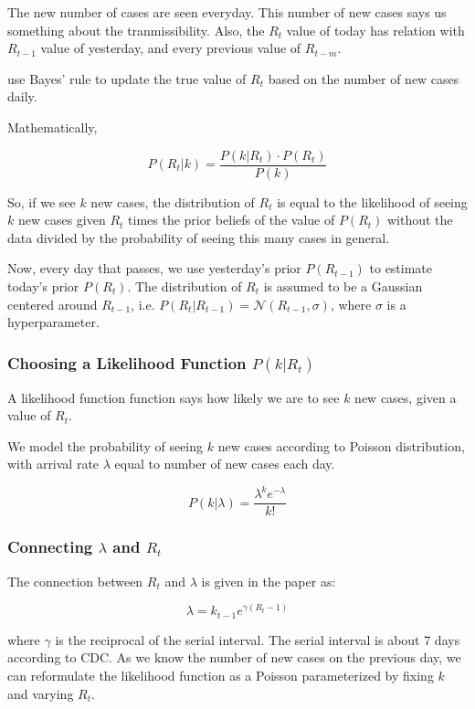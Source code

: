 \documentclass{article}
\begin{document}
The new number of cases are seen everyday. This number of new cases says us something about the tranmissibility. Also, the $R_t$ value of today has relation with $R_{t-1}$ value of yesterday, and every previous value of $R_{t-m}$.

\cite{bettencourt2008real} use Bayes' rule to update the true value of $R_t$ based on the number of new cases daily.

Mathematically,

$$ P(R_t|k)=\frac{P(k|R_t)\cdot P(R_t)}{P(k)} $$

So, if we see $k$ new cases, the distribution of $R_t$ is equal to the likelihood of seeing $k$ new cases given $R_t$ times the prior beliefs of the value of $P(R_t)$ without the data divided by the probability of seeing this many cases in general.

Now, every day that passes, we use yesterday's prior $P(R_{t-1})$ to estimate today's prior $P(R_t)$. The distribution of $R_t$ is assumed to be a Gaussian centered around $R_{t-1}$, i.e. $P(R_t|R_{t-1})=\mathcal{N}(R_{t-1}, \sigma)$, where $\sigma$ is a hyperparameter.

\subsubsection*{Choosing a Likelihood Function $P\left(k|R_t\right)$}

A likelihood function function says how likely we are to see $k$ new cases, given a value of $R_t$.

We model the probability of seeing $k$ new cases according to Poisson distribution, with arrival rate $\lambda$ equal to number of new cases each day.

$$P(k|\lambda) = \frac{\lambda^k e^{-\lambda}}{k!}$$

\subsubsection*{Connecting $\lambda$ and $R_t$}

The connection between $R_t$ and $\lambda$ is given in the paper as:

$$ \lambda = k_{t-1}e^{\gamma(R_t-1)}$$

where $\gamma$ is the reciprocal of the serial interval. The serial interval is about 7 days according to CDC. As we know the number of new cases on the previous day, we can reformulate the likelihood function as a Poisson parameterized by fixing $k$ and varying $R_t$.
\end{document}
